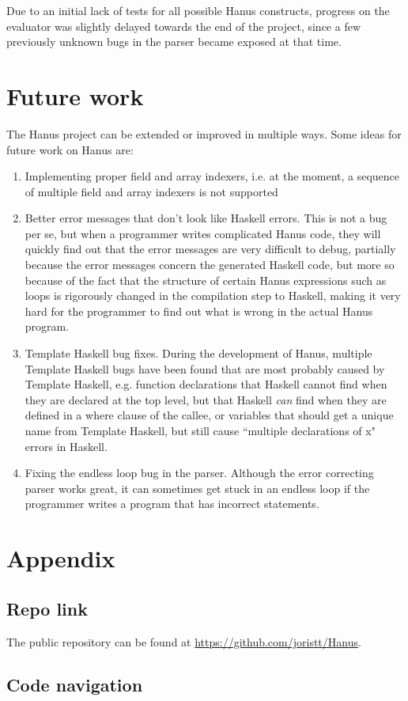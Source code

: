 \documentclass[12pt,a4paper]{article}
\begin{document}
Due to an initial lack of tests for all possible Hanus constructs, progress on the evaluator was slightly delayed towards the end of the project, since a few previously unknown bugs in the parser became exposed at that time. 
\section{Future work}
	The Hanus project can be extended or improved in multiple ways. Some ideas for future work on Hanus are:
        \begin{enumerate}
                	\item Implementing proper field and array indexers, i.e. at the moment, a sequence of multiple field and array indexers is not supported
                	\item Better error messages that don't look like Haskell errors. This is not a bug per se, but when a programmer writes complicated Hanus code, they will quickly find out that the error messages are very difficult to debug, partially because the error messages concern the generated Haskell code, but more so because of the fact that the structure of certain Hanus expressions such as loops is rigorously changed in the compilation step to Haskell, making it very hard for the programmer to find out what is wrong in the actual Hanus program.
                	\item Template Haskell bug fixes. During the development of Hanus, multiple Template Haskell bugs have been found that are most probably caused by Template Haskell, e.g. function declarations that Haskell cannot find when they are declared at the top level, but that Haskell \emph{can} find when they are defined in a where clause of the callee, or variables that should get a unique name from Template Haskell, but still cause ``multiple declarations of x" errors in Haskell.
                	\item Fixing the endless loop bug in the parser. Although the error correcting parser works great, it can sometimes get stuck in an endless loop if the programmer writes a program that has incorrect statements.
        \end{enumerate}

\section{Appendix}
    \subsection{Repo link}
    The public repository can be found at \url{https://github.com/joristt/Hanus}.
    \subsection{Code navigation}

\newpage


\end{document}
